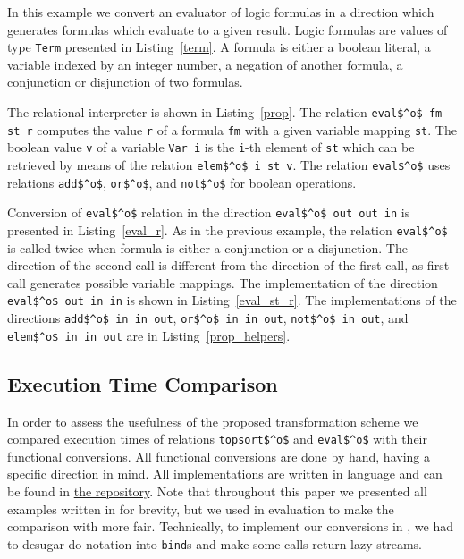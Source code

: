 In this example we convert an evaluator of logic formulas in a direction which generates formulas which evaluate to a given result.
Logic formulas are values of type \lstinline{Term} presented in Listing~\ref{term}.
A formula is either a boolean literal, a variable indexed by an integer number, a negation of another formula, a conjunction or disjunction of two formulas.



The relational interpreter is shown in Listing~\ref{prop}.
The relation \lstinline{eval$^o$ fm st r} computes the value \lstinline{r} of a formula \lstinline{fm} with a given variable mapping \lstinline{st}.
The boolean value \lstinline{v} of a variable \lstinline{Var i} is the \lstinline{i}-th element of \lstinline{st} which can be retrieved by means of the relation \lstinline{elem$^o$ i st v}.
The relation \lstinline{eval$^o$} uses relations \lstinline{add$^o$}, \lstinline{or$^o$}, and \lstinline{not$^o$} for boolean operations.

Conversion of \lstinline{eval$^o$} relation in the direction \lstinline[breaklines=true]{eval$^o$ out out in} is presented in Listing~\ref{eval_r}.
As in the previous example, the relation \lstinline{eval$^o$} is called twice when formula is either a conjunction or a disjunction.
The direction of the second call is different from the direction of the first call, as first call generates possible variable mappings.
The implementation of the direction \lstinline{eval$^o$ out in in} is shown in Listing~\ref{eval_st_r}.
The implementations of the directions \lstinline{add$^o$ in in out}, \lstinline{or$^o$ in in out}, \lstinline{not$^o$ in out}, and \lstinline{elem$^o$ in in out} are in Listing~\ref{prop_helpers}.







\subsection{Execution Time Comparison}

In order to assess the usefulness of the proposed transformation scheme we compared execution times of \mk relations \lstinline{topsort$^o$} and \lstinline{eval$^o$} with their functional conversions.
All functional conversions are done by hand, having a specific direction in mind.
All implementations are written in \ocaml language and can be found in \href{https://github.com/kajigor/miniKanren-func/tree/f7a3ab72fe1a945a650a443627be35093d7224a0}{the repository}.
Note that throughout this paper we presented all examples written in \haskell for brevity, but we used \ocaml in evaluation to make the comparison with \ocanren more fair.
Technically, to implement our conversions in \ocaml, we had to desugar \haskell do-notation into \lstinline{bind}s and make some calls return lazy streams.


